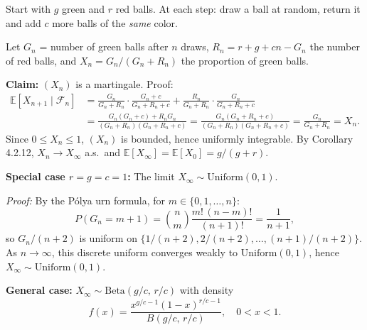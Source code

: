 \documentclass[12pt]{article}
\newcommand{\E}{\mathbb{E}}
\newcommand{\F}{\mathcal{F}}
\newcommand{\1}{\mathbf{1}}
\begin{document}
\begin{tcolorbox}[redbox={Example: Pólya's Urn Scheme}]
Start with $g$ green and $r$ red balls.  At each step: draw a ball at random, return it
and add $c$ more balls of the \emph{same} color.

Let $G_n$ = number of green balls after $n$ draws, $R_n = r + g + cn - G_n$ the
number of red balls, and $X_n = G_n/(G_n + R_n)$ the proportion of green balls.

\medskip
\textbf{Claim:} $(X_n)$ is a martingale.  Proof:
\begin{align*}
  \E[X_{n+1} \mid \F_n]
  &= \frac{G_n}{G_n+R_n} \cdot \frac{G_n+c}{G_n+R_n+c}
   + \frac{R_n}{G_n+R_n} \cdot \frac{G_n}{G_n+R_n+c} \\
  &= \frac{G_n(G_n+c) + R_n G_n}{(G_n+R_n)(G_n+R_n+c)}
   = \frac{G_n(G_n+R_n+c)}{(G_n+R_n)(G_n+R_n+c)}
   = \frac{G_n}{G_n+R_n} = X_n.
\end{align*}
Since $0 \le X_n \le 1$, $(X_n)$ is bounded, hence uniformly integrable.
By Corollary 4.2.12, $X_n \to X_\infty$ a.s.\ and $\E[X_\infty] = \E[X_0] = g/(g+r)$.

\medskip
\textbf{Special case $r = g = c = 1$:} The limit $X_\infty \sim \mathrm{Uniform}(0,1)$.

\medskip
\textit{Proof:} By the Pólya urn formula, for $m \in \{0, 1, \ldots, n\}$:
\[
  P(G_n = m+1) = \binom{n}{m} \frac{m!\,(n-m)!}{(n+1)!} = \frac{1}{n+1},
\]
so $G_n/(n+2)$ is uniform on $\{1/(n+2), 2/(n+2), \ldots, (n+1)/(n+2)\}$.
As $n \to \infty$, this discrete uniform converges weakly to $\mathrm{Uniform}(0,1)$,
hence $X_\infty \sim \mathrm{Uniform}(0,1)$.

\medskip
\textbf{General case:} $X_\infty \sim \mathrm{Beta}(g/c,\, r/c)$ with density
\[
  f(x) = \frac{x^{g/c-1}(1-x)^{r/c-1}}{B(g/c,\,r/c)}, \quad 0 < x < 1.
\]
\end{tcolorbox}
\end{document}
